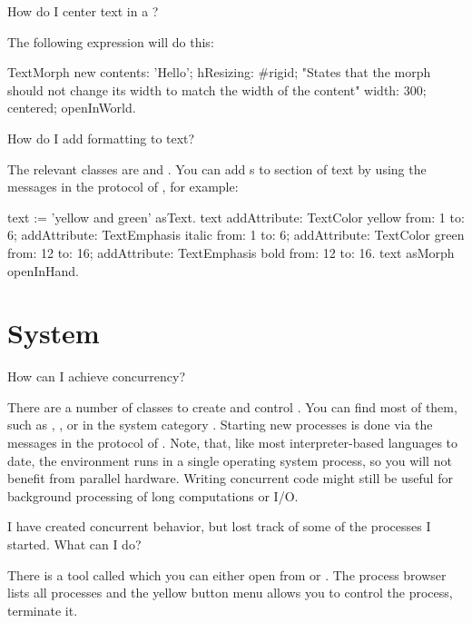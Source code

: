 \documentclass[a4paper,10pt,twoside]{book}
\begin{document}
\begin{faq}
How do I center text in a ?
\end{faq}
\answer
The following expression will do this:
\begin{code}{}
TextMorph new
    contents: 'Hello';
    hResizing: #rigid; "States that the morph should not change 
                        its width to match the width of the content"
    width: 300;
    centered;
    openInWorld.
\end{code}  

\begin{faq}
How do I add formatting to text?
\end{faq}
\answer
The relevant classes are  and . 
You can add s to section of text by using the messages in the  protocol of , for example:
\begin{code}{}
text := 'yellow and green' asText.
text 
	addAttribute: TextColor yellow from: 1 to: 6;
	addAttribute: TextEmphasis italic from: 1 to: 6;
	addAttribute: TextColor green from: 12 to: 16;
	addAttribute: TextEmphasis bold from: 12 to: 16.
text asMorph openInHand.
\end{code}  

\section{System}

\begin{faq}
How can I achieve concurrency?
\end{faq}
\answer
There are a number of classes to create and control .
You can find most of them, such as , , or  in the system category .
Starting new processes is done via the messages in the  protocol of .
Note, that, like most interpreter-based languages to date, the \sq environment runs in a single operating system process, so you will not benefit from parallel hardware.
Writing concurrent code might still be useful for background processing of long computations or I/O.

\begin{faq}
I have created concurrent behavior, but lost track of some of the processes I started. 
What can I do?
\end{faq}
\answer
There is a tool called  which you can either open from  or . 
The process browser lists all processes and the yellow button menu allows you to control the process, \eg terminate it.
\end{document}
